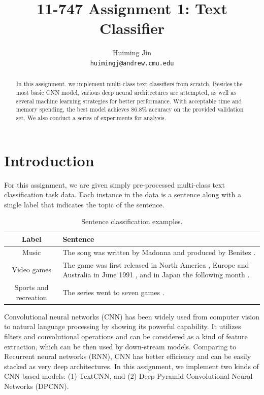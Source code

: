 \documentclass[11pt,letterpaper]{article}
\title{11-747 Assignment 1: Text Classifier}
\author{Huiming Jin \\ \texttt{huimingj@andrew.cmu.edu}}
\date{}
\begin{document}
\maketitle 
\begin{abstract}
    In this assignment, we implement multi-class text classifiers from scratch. 
    Besides the most basic CNN model, various deep neural architectures are 
    attempted, as well as several machine learning strategies for better 
    performance. With acceptable time and memory spending, the best model 
    achieves 86.8\% accuracy on the provided validation set. We also conduct a 
    series of experiments for analysis.
\end{abstract}

\section{Introduction}
    For this assignment, we are given simply pre-processed multi-class text
    classification task data. Each instance in the data is a sentence along with
    a single label that indicates the topic of the sentence.

    \begin{table}[htbp]
        \centering
        \small
        \begin{tabular}{cp{4.2cm}}
            \toprule
                {\bf Label} & {\bf Sentence} \\
            \midrule
                Music       & The song was written by Madonna and produced by Benitez . \\
            \midrule
                Video games & The game was first released in North America , Europe and Australia in June 1991 , and in Japan the following month . \\
            \midrule
                Sports and recreation & The series went to seven games . \\
            \bottomrule
        \end{tabular}
        \caption{\label{tab:data-example} Sentence classification examples.}
    \end{table}

    Convolutional neural networks (CNN) has been widely used from computer 
    vision to natural language processing by showing its powerful capability.
    It utilizes filters and convolutional operations and can be considered as a
    kind of feature extraction, which can be then used by down-stream models.
    Comparing to Recurrent neural networks (RNN), CNN has better efficiency and
    can be easily stacked as very deep architectures. In this assignment, we 
    implement two kinds of CNN-based models: (1) TextCNN, and 
    (2) Deep Pyramid Convolutional Neural Networks (DPCNN).
\end{document}
